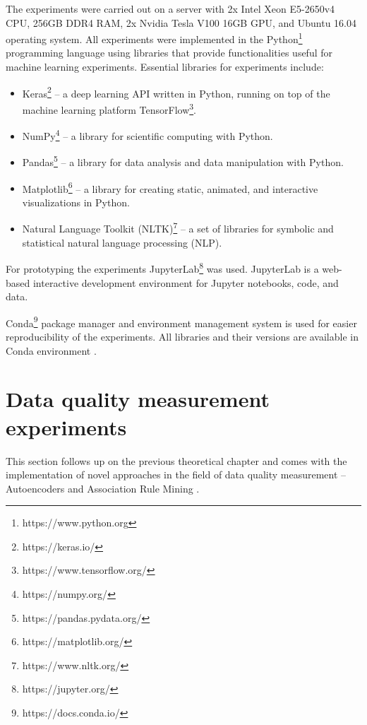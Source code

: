 		The experiments were carried out on a server with 2x Intel Xeon E5-2650v4 CPU, 256GB DDR4 RAM, 2x Nvidia Tesla V100 16GB GPU, and Ubuntu 16.04 operating system. All experiments were implemented in the Python\footnote{https://www.python.org} programming language using libraries that provide functionalities useful for machine learning experiments. Essential libraries for experiments include: 
		
			\begin{itemize}
				\item Keras\footnote{https://keras.io/} -- a deep learning API written in Python, running on top of the machine learning platform TensorFlow\footnote{https://www.tensorflow.org/}.
				\item  NumPy\footnote{https://numpy.org/} -- a library for scientific computing with Python.
				\item Pandas\footnote{https://pandas.pydata.org/} -- a library for data analysis and data manipulation with Python.
				\item Matplotlib\footnote{https://matplotlib.org/} -- a library for creating static, animated, and interactive visualizations in Python.
				\item Natural Language Toolkit (NLTK)\footnote{https://www.nltk.org/} -- a set of libraries for symbolic and statistical natural language processing (NLP).
			\end{itemize}
					
		For prototyping the experiments JupyterLab\footnote{https://jupyter.org/} was used. JupyterLab is a web-based interactive development environment for Jupyter notebooks, code, and data.

		Conda\footnote{https://docs.conda.io/} package manager and environment management system is used for easier reproducibility of the experiments. All libraries and their versions are available in Conda environment .

    \section{Data quality measurement experiments}
    
		This section follows up on the previous theoretical chapter  and comes with the implementation of novel approaches in the field of data quality measurement -- Autoencoders  and Association Rule Mining .
	
